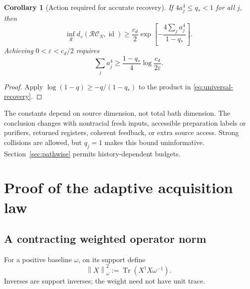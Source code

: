 \documentclass[11pt]{article}
\numberwithin{equation}{section}
\newtheorem{corollary}[theorem]{Corollary}
\theoremstyle{remark}
\newcommand{\Tr}{\operatorname{Tr}}
\newcommand{\id}{\operatorname{id}}
\newcommand{\Ccal}{\mathcal C}
\newcommand{\norm}[1]{\left\lVert#1\right\rVert}
\newcommand{\eps}{\varepsilon}
\begin{document}
\begin{corollary}[Action required for accurate recovery]
\label{cor:action}
If \(4a_j^4\le q_*<1\) for all \(j\), then
\begin{equation}
 \inf_{\mathcal R}d_\diamond(\mathcal R\Ccal_N,\id)
 \ge\frac{c_d}{2}
 \exp\left[-\frac{4\sum_j a_j^4}{1-q_*}\right].
 \label{eq:action-converse}
\end{equation}
Achieving \(0<\eps<c_d/2\) requires
\begin{equation}
 \sum_j a_j^4\ge\frac{1-q_*}{4}\log\frac{c_d}{2\eps}.
 \label{eq:action-budget}
\end{equation}
\end{corollary}
\begin{proof}
Apply \(\log(1-q)\ge-q/(1-q_*)\) to the product in
\eqref{eq:universal-recovery}.
\end{proof}

The constants depend on source dimension, not total bath dimension. The
conclusion changes with nontracial fresh inputs, accessible preparation
labels or purifiers, returned registers, coherent feedback, or extra source
access. Strong collisions are allowed, but \(q_j=1\) makes this bound
uninformative. Section~\ref{sec:pathwise} permits history-dependent budgets.

\section{Proof of the adaptive acquisition law}
\label{sec:proof}
\subsection{A contracting weighted operator norm}
For a positive baseline \(\omega\), on its support define
\begin{equation}
 \norm{X}_\omega^2:=\Tr(X^\dagger X\omega^{-1}).
 \label{eq:weighted}
\end{equation}
Inverses are support inverses; the weight need not have unit trace.
\end{document}
